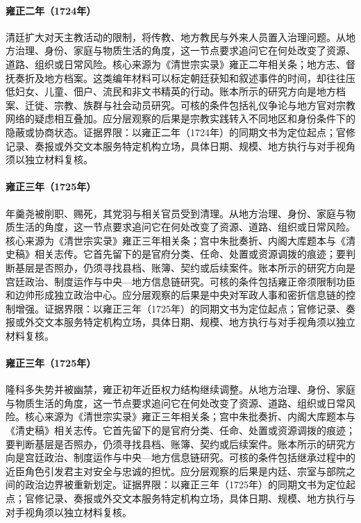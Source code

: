 \hypertarget{social:EQ-1724-CATHOLIC-PROSCRIPTION}{}\paragraph{雍正二年（1724年）}清廷扩大对天主教活动的限制，将传教、地方教民与外来人员置入治理问题。从地方治理、身份、家庭与物质生活的角度，这一节点要求追问它在何处改变了资源、道路、组织或日常风险。核心来源为《清世宗实录》雍正二年相关条；地方志、督抚奏折及地方档案。这类编年材料可以标定朝廷获知和叙述事件的时间，却往往压低妇女、儿童、佃户、流民和非文书精英的行动。账本所示的研究方向是地方档案、迁徙、宗教、族群与社会动员研究。可核的条件包括礼仪争论与地方官对宗教网络的疑虑相互叠加。应分层观察的后果是宗教实践转入不同地区和身份条件下的隐蔽或协商状态。证据界限：以雍正二年（1724年）的同期文书为定位起点；官修记录、奏报或外交文本服务特定机构立场，具体日期、规模、地方执行与对手视角须以独立材料复核。
\hypertarget{social:EQ-1725-NIAN-GENGYAO-PUNISHMENT}{}\paragraph{雍正三年（1725年）}年羹尧被削职、赐死，其党羽与相关官员受到清理。从地方治理、身份、家庭与物质生活的角度，这一节点要求追问它在何处改变了资源、道路、组织或日常风险。核心来源为《清世宗实录》雍正三年相关条；宫中朱批奏折、内阁大库题本与《清史稿》相关志传。它首先留下的是官府分类、任命、处置或资源调拨的痕迹；要判断基层是否照办，仍须寻找县档、账簿、契约或后续案件。账本所示的研究方向是宫廷政治、制度运作与中央—地方信息链研究。可核的条件包括雍正帝须限制功臣和边帅形成独立政治中心。应分层观察的后果是中央对军政人事和密折信息链的控制增强。证据界限：以雍正三年（1725年）的同期文书为定位起点；官修记录、奏报或外交文本服务特定机构立场，具体日期、规模、地方执行与对手视角须以独立材料复核。
\hypertarget{social:EQ-1725-TAN-TEBI-CASE}{}\paragraph{雍正三年（1725年）}隆科多失势并被幽禁，雍正初年近臣权力结构继续调整。从地方治理、身份、家庭与物质生活的角度，这一节点要求追问它在何处改变了资源、道路、组织或日常风险。核心来源为《清世宗实录》雍正三年相关条；宫中朱批奏折、内阁大库题本与《清史稿》相关志传。它首先留下的是官府分类、任命、处置或资源调拨的痕迹；要判断基层是否照办，仍须寻找县档、账簿、契约或后续案件。账本所示的研究方向是宫廷政治、制度运作与中央—地方信息链研究。可核的条件包括继承过程中的近臣角色引发君主对安全与忠诚的担忧。应分层观察的后果是内廷、宗室与部院之间的政治边界被重新划定。证据界限：以雍正三年（1725年）的同期文书为定位起点；官修记录、奏报或外交文本服务特定机构立场，具体日期、规模、地方执行与对手视角须以独立材料复核。
